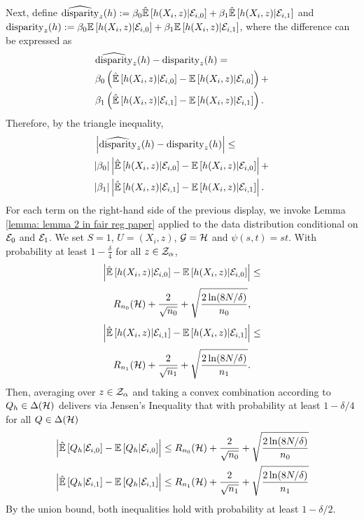 \documentclass{article}
\begin{document}
Next, define $\widehat{\operatorname{disparity}}_z(h) := \beta_0 \hat{\mathbb{E}}\left[ h(X_i, z) | \mathcal{E}_{i,0} \right] + \beta_1 \hat{\mathbb{E}}\left[ h(X_i, z) | \mathcal{E}_{i,1} \right]$ and $\operatorname{disparity}_z(h) := \beta_0 \mathbb{E}\left[ h(X_i, z) | \mathcal{E}_{i,0} \right] + \beta_1 \mathbb{E}\left[ h(X_i, z) | \mathcal{E}_{i,1} \right]$, where the difference can be expressed as 
    \begin{align*}
        & \widehat{\operatorname{disparity}}_z(h) - \operatorname{disparity}_z(h) = \\
        & \beta_0 \left( \hat{\mathbb{E}}\left[ h(X_i, z) | \mathcal{E}_{i,0} \right] - \mathbb{E}\left[ h(X_i, z) | \mathcal{E}_{i,0} \right] \right) + \\
        & \beta_1 \left(  \hat{\mathbb{E}}\left[ h(X_i, z) | \mathcal{E}_{i,1} \right] - \mathbb{E}\left[ h(X_i, z) | \mathcal{E}_{i,1} \right] \right).
    \end{align*}
Therefore, by the triangle inequality, 
    \begin{align*}
        & \left| \widehat{\operatorname{disparity}}_z(h) - \operatorname{disparity}_z(h) \right| \leq \\
        &|\beta_0| \left| \hat{\mathbb{E}}\left[ h(X_i, z) | \mathcal{E}_{i,0} \right] - \mathbb{E}\left[ h(X_i, z) | \mathcal{E}_{i,0} \right] \right| + \\ 
        & |\beta_1| \left| \hat{\mathbb{E}}\left[ h(X_i, z) | \mathcal{E}_{i,1} \right] - \mathbb{E}\left[ h(X_i, z) | \mathcal{E}_{i,1} \right] \right|.
    \end{align*}
For each term on the right-hand side of the previous display, we invoke Lemma \ref{lemma: lemma 2 in fair reg paper} applied to the data distribution conditional on $\mathcal{E}_0$ and $\mathcal{E}_1$. We set $S = 1$, $U = (X_i, z)$, $\mathcal{G} = \mathcal{H}$ and $\psi(s, t) = st$. With probability at least $1 - \frac{\delta}{4}$ for all $z \in \mathcal{Z}_\alpha$,
\[
\left| \hat{\mathbb{E}}\left[ h(X_i, z) | \mathcal{E}_{i,0} \right] - \mathbb{E}\left[ h(X_i, z) | \mathcal{E}_{i,0} \right] \right| \leq 
\]
\[
R_{n_0}(\mathcal{H}) + \frac{2}{\sqrt{n_0}} + \sqrt{ \frac{ 2 \ln(8 N /\delta)}{n_0} },
\]
\[
\left| \hat{\mathbb{E}}\left[ h(X_i, z) | \mathcal{E}_{i,1} \right] - \mathbb{E}\left[ h(X_i, z) | \mathcal{E}_{i,1} \right] \right| \leq
\]
\[
R_{n_1}(\mathcal{H}) + \frac{2}{\sqrt{n_1}} + \sqrt{ \frac{ 2 \ln(8 N /\delta)}{n_1} }.
\]
Then, averaging over $z \in \mathcal{Z}_\alpha$ and taking a convex combination according to $Q_h \in \Delta(\mathcal{H})$ delivers via Jensen's Inequality that with probability at least $1 - \delta/4$ for all $Q \in \Delta(\mathcal{H})$
        \begin{align}
            & \left| \hat{\mathbb{E}}\left[ Q_h | \mathcal{E}_{i,0} \right] - \mathbb{E}\left[ Q_h | \mathcal{E}_{i,0} \right] \right| \leq R_{n_0}(\mathcal{H}) + \frac{2}{\sqrt{n_0}} + \sqrt{ \frac{ 2 \ln(8 N /\delta)}{n_0} } \label{eqn: fairness bound (i), extremes} \\
            & \left| \hat{\mathbb{E}}\left[ Q_h | \mathcal{E}_{i,1} \right] - \mathbb{E}\left[ Q_h | \mathcal{E}_{i,1} \right] \right| \leq R_{n_1}(\mathcal{H}) + \frac{2}{\sqrt{n_1}} + \sqrt{ \frac{ 2 \ln(8 N /\delta)}{n_1} } \label{eqn: fairness bound (ii), extremes}
        \end{align}
By the union bound, both inequalities hold with probability at least $1 - \delta/2$.
    
\end{document}
